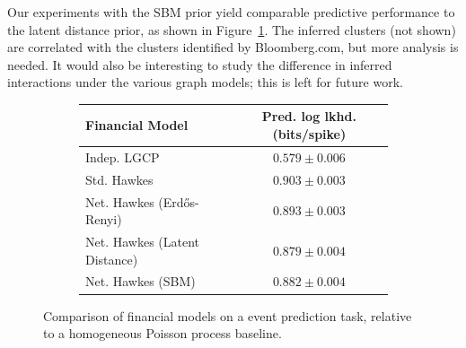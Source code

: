 Our experiments with the SBM prior yield comparable predictive performance to the latent distance prior, as shown in Figure~\ref{fig:financial_pred_ll_sbm}. The inferred clusters (not shown) are correlated with the clusters identified by Bloomberg.com, but more analysis is needed. It would also be interesting to study the difference in inferred interactions under the various graph models; this is left for future work.

\begin{figure}[!h]
\begin{subfigure}[T]{\linewidth}
\begin{small}
\begin{tabular}{|l|c|}
\hline
\textbf{Financial Model} & \textbf{Pred. log lkhd. (bits/spike)} \\
\hline
Indep. LGCP & $0.579\pm 0.006$ \\
Std. Hawkes & $0.903\pm 0.003$ \\
Net. Hawkes (Erd\H{o}s-Renyi) & $0.893\pm 0.003$ \\
Net. Hawkes (Latent Distance) & $0.879\pm 0.004$ \\
Net. Hawkes (SBM) & $0.882\pm 0.004$ \\
\hline
\end{tabular}
\end{small}
\end{subfigure}
\caption{Comparison of financial models on a event prediction task, relative to a homogeneous Poisson process baseline.}
\label{fig:financial_pred_ll_sbm}
\end{figure}


